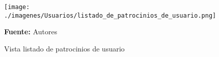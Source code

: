\begin{figure}[!htb]
  \begin{center}
\texttt{[image: ./imagenes/Usuarios/listado\_de\_patrocinios\_de\_usuario.png]}
    \caption{Vista listado de patrocinios de usuario}
    \label{fig:Vista_listado_de_patrocinios_de_usuario}
    \textbf{Fuente:}  Autores
  \end{center}
\end{figure}
